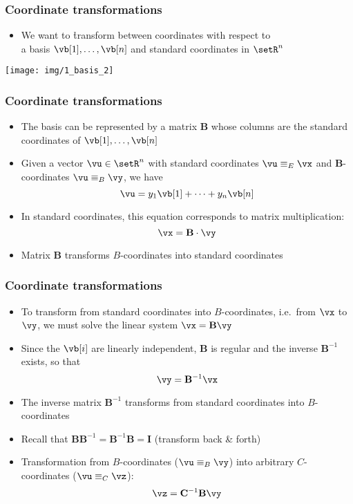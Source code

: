 \begin{frame}
  \frametitle{Coordinate transformations}

  \begin{itemize}
  \item We want to \h{transform} between coordinates with respect to\\ a basis
    $\vb[1],\ldots,\vb[n]$ and standard coordinates in $\setR^n$
  \end{itemize}

  \begin{center}
    \texttt{[image: img/1\_basis\_2]}
  \end{center}
\end{frame}

\begin{frame}
  \frametitle{Coordinate transformations}

  \begin{itemize}
  \item The basis can be represented by a matrix $\mathbf{B}$ whose columns are the
    standard coordinates of $\vb[1],\ldots,\vb[n]$
  \item Given a vector $\vu \in \setR^n$ with standard coordinates $\vu
    \equiv_E \vx$ and $\mathbf{B}$-coordinates $\vu \equiv_B \vy$, we have
    \[ \vu = y_1 \vb[1] + \dots + y_n \vb[n] \]
    \pause\ungap
  \item In standard coordinates, this equation corresponds to matrix
    multiplication:
    \[ \vx = \mathbf{B}\cdot \vy \]
  \item[\So] Matrix $\mathbf{B}$ transforms $B$-coordinates into standard coordinates
  \end{itemize}
\end{frame}

\begin{frame}
  \frametitle{Coordinate transformations}

  \begin{itemize}
  \item  To transform from standard coordinates into $B$-coordinates,
    i.e.\ from $\vx$ to $\vy$, we must solve the linear system $\vx = \mathbf{B}
    \vy$%
    \pause
  \item Since the $\vb[i]$ are linearly independent, $\mathbf{B}$ is regular and the
    inverse $\mathbf{B}^{-1}$ exists, so that
    \[ \vy = \mathbf{B}^{-1} \vx \]
  \item[\So] The inverse matrix $\mathbf{B}^{-1}$ transforms from standard coordinates
    into $B$-coordinates%
    \pause
  \item Recall that $\mathbf{B} \mathbf{B}^{-1} = \mathbf{B}^{-1} \mathbf{B} =
    \mathbf{I}$ (transform back \& forth)
  \item Transformation from $B$-coordinates ($\vu \equiv_B \vy$) into
    arbitrary $C$-coordinates ($\vu \equiv_C \vz$):
    \[ \vz = \mathbf{C}^{-1} \mathbf{B} \vy \]
  \end{itemize}
\end{frame}

